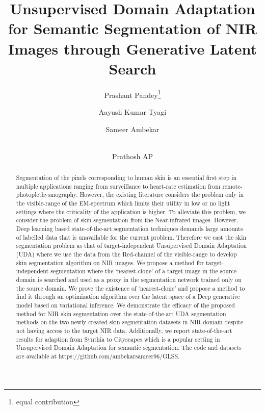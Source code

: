 \documentclass[runningheads]{llncs}
\makeatletter
\newcommand{\printfnsymbol}[1]{\textsuperscript{\@fnsymbol{#1}}}
\makeatother
\begin{document}
\pagestyle{headings}
\mainmatter
\def\ECCVSubNumber{6124}  \title{Unsupervised Domain Adaptation for Semantic Segmentation of NIR Images through Generative Latent Search}
\author{Prashant Pandey\thanks{equal contribution} \and
Aayush Kumar Tyagi\printfnsymbol{1} \and
Sameer Ambekar \and \\ Prathosh AP}
\maketitle
\begin{abstract}
Segmentation of the pixels corresponding to human skin is an essential first step in multiple applications ranging from surveillance to heart-rate estimation from remote-photoplethysmography. However, the existing literature considers the problem only in the visible-range of the EM-spectrum which limits their utility in low or no light settings where the criticality of the application is higher. To alleviate this problem, we consider the problem of skin segmentation from the Near-infrared images. However, Deep learning based state-of-the-art segmentation techniques demands large amounts of labelled data that is unavailable for the current problem. Therefore we cast the skin segmentation problem as that of target-independent Unsupervised Domain Adaptation (UDA) where we use the data from the Red-channel of the visible-range to develop skin segmentation algorithm on NIR images. We propose a method for target-independent segmentation where the `nearest-clone' of a target image in the source domain is searched and used as a proxy in the segmentation network trained only on the source domain. We prove the existence of `nearest-clone' and propose a method to find it through an  optimization algorithm  over the latent space of a Deep generative model based on variational inference. We demonstrate the efficacy of the proposed method for NIR skin segmentation over  the  state-of-the-art UDA  segmentation  methods on  the two newly  created skin segmentation datasets in NIR domain despite not having access to the target NIR data. Additionally, we report state-of-the-art results for adaption from Synthia to Cityscapes  which is a popular setting in Unsupervised Domain Adaptation for semantic segmentation. The code and datasets are available at https://github.com/ambekarsameer96/GLSS.

\end{abstract}
\end{document}
